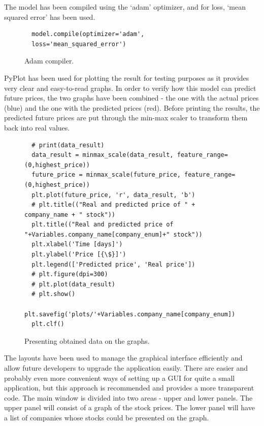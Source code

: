 \clearpage
The model has been compiled using the ‘adam’ optimizer, and for loss, ‘mean squared error’ has been used.

\begin{figure}
\centering
\begin{lstlisting}
  model.compile(optimizer='adam',
  loss='mean_squared_error')
\end{lstlisting}
\caption{Adam compiler.}
\label{fig:pseudocode:listings}
\end{figure}

\clearpage
PyPlot has been used for plotting the result for testing purposes as it provides very clear and easy-to-read graphs. In order to verify how this model can predict future prices, the two graphs have been combined - the one with the actual prices (blue) and the one with the predicted prices (red). Before printing the results, the predicted future prices are put through the min-max scaler to transform them back into real values.

\begin{figure}
\centering
\begin{lstlisting}
  # print(data_result)
  data_result = minmax_scale(data_result, feature_range=(0,highest_price))
  future_price = minmax_scale(future_price, feature_range=(0,highest_price))
  plt.plot(future_price, 'r', data_result, 'b')
  # plt.title(("Real and predicted price of " + company_name + " stock"))
  plt.title(("Real and predicted price of "+Variables.company_name[company_enum]+" stock"))
  plt.xlabel('Time [days]')
  plt.ylabel('Price [{\$}]')
  plt.legend(['Predicted price', 'Real price'])
  # plt.figure(dpi=300)
  # plt.plot(data_result)
  # plt.show()
  plt.savefig('plots/'+Variables.company_name[company_enum])
  plt.clf()
\end{lstlisting}
\caption{Presenting obtained data on the graphs.}
\label{fig:pseudocode:listings}
\end{figure}

\clearpage
The layouts have been used to manage the graphical interface efficiently and allow future developers to upgrade the application easily. There are easier and probably even more convenient ways of setting up a GUI for quite a small application, but this approach is recommended and provides a more transparent code. The main window is divided into two areas -  upper and lower panels. The upper panel will consist of a graph of the stock prices. The lower panel will have a list of companies whose stocks could be presented on the graph.

